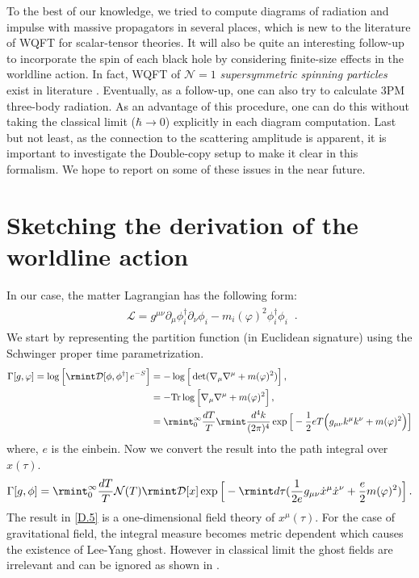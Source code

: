 To the best of our knowledge, we tried to compute diagrams of radiation and impulse with massive propagators in several places, which is new to the literature of WQFT for scalar-tensor theories. It will also be quite an interesting follow-up to incorporate the spin of each black hole by considering finite-size effects in the worldline action. In fact, WQFT of $\mathcal{N}=1 $ \textit{supersymmetric spinning particles} exist in literature \cite{Jakobsen:2021lvp}. Eventually, as a follow-up, one can also try to calculate 3PM three-body radiation. As an advantage of this procedure, one can do this without taking the classical limit ($\hbar\rightarrow 0$) explicitly in each diagram computation. Last but not least, as the connection to the scattering amplitude is apparent, it is important to investigate the Double-copy setup to make it clear in this formalism. We hope to report on some of these issues in the near future. 



\appendix 
\section{Sketching the derivation of the worldline action}\label{ch2:app:A}
In our case, the matter Lagrangian has the following form:
\begin{align}
    \begin{split}
        \mathcal{L}=g^{\mu\nu}\partial_\mu\phi_i^{\dagger}\partial_\nu\phi_i-m_i(\varphi)^2\phi_i^{\dagger}\phi_i
    \end{split}
\,.\end{align}
We start by representing the partition function (in Euclidean signature)  using the Schwinger proper time parametrization.
\begin{align}
    \Gamma[g,\varphi]=\log\Big[\rmint \mathcal{D}[\phi,\phi^{\dagger}]\,e^{-S}\Big] &=-\log\Big[\det(\nabla_{\mu}\nabla^\mu+m(\varphi)^2)\Big]\,,\\ &
    =-\textrm{Tr}\log\Big[\nabla_{\mu}\nabla^\mu+m(\varphi)^2\Big]\,,\\ &
    =\rmint_0^\infty \frac{dT}{T}\rmint \frac{d^4 k}{(2\pi)^4}\exp\Big[-\frac{1}{2}eT\Big(g_{\mu\nu}k^\mu k^\nu+m(\varphi)^2\Big)\Big]
\end{align}
where, $e$ is the einbein. Now we convert the result into the path integral over $x(\tau)$.
\begin{align}
    \begin{split}
        \Gamma[g,\phi]=\rmint_0^\infty \frac{dT}{T}\mathcal{N}(T)\rmint \mathcal{D}[x]\exp\Big[-\rmint d\tau (\frac{1}{2e}g_{\mu\nu}\dot x^\mu\dot x^\nu+\frac{e}{2}m(\varphi)^2)\Big]\,.\label{D.5}
    \end{split}
\end{align}
The result in \eqref{D.5} is a one-dimensional field theory of $x^\mu(\tau)$. For the  case of gravitational field, the integral measure becomes metric dependent which causes the existence of Lee-Yang ghost. However in classical limit the ghost fields are irrelevant and can be ignored as shown in \cite{Mogull:2020sak}.
